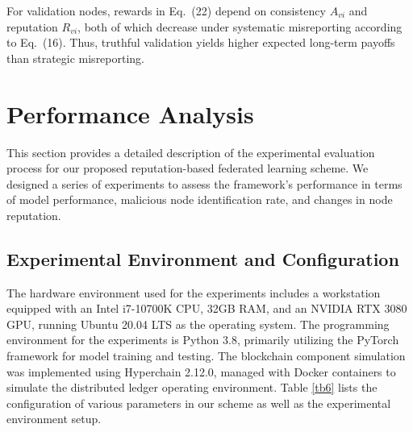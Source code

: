 \documentclass[a4paper]{cas-dc}
\begin{document}
For validation nodes, rewards in Eq.~(22) depend on consistency $A_{vi}$ and reputation $R_{vi}$, both of which decrease under systematic misreporting according to Eq.~(16). Thus, truthful validation yields higher expected long-term payoffs than strategic misreporting.


\section{Performance Analysis}\label{sec:5}
This section provides a detailed description of the experimental evaluation process for our proposed reputation-based federated learning scheme. We designed a series of experiments to assess the framework's performance in terms of model performance, malicious node identification rate, and changes in node reputation.
\subsection{Experimental Environment and Configuration}
The hardware environment used for the experiments includes a workstation equipped with an Intel i7-10700K CPU, 32GB RAM, and an NVIDIA RTX 3080 GPU, running Ubuntu 20.04 LTS as the operating system. The programming environment for the experiments is Python 3.8, primarily utilizing the PyTorch framework for model training and testing. The blockchain component simulation was implemented using Hyperchain 2.12.0\cite{57}, managed with Docker containers to simulate the distributed ledger operating environment. Table \ref{tb6} lists the configuration of various parameters in our scheme as well as the experimental environment setup.
\end{document}
